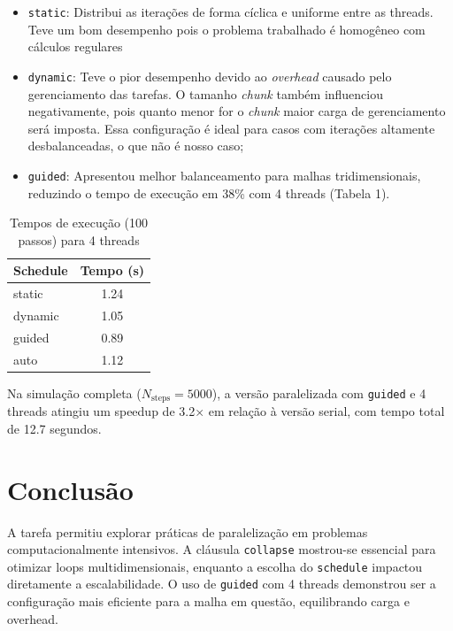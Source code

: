 \documentclass[a4paper, 12pt]{article}
\begin{document}
	
	\begin{itemize}  
		\item \texttt{static}: Distribui as iterações de forma cíclica e uniforme entre as threads. Teve um bom desempenho pois o problema trabalhado é homogêneo com cálculos regulares    
		\item \texttt{dynamic}: Teve o pior desempenho devido ao \textit{overhead} causado pelo gerenciamento das tarefas. O tamanho \textit{chunk} também influenciou negativamente, pois quanto menor for o \textit{chunk} maior carga de gerenciamento será imposta. Essa configuração é ideal para casos com iterações altamente desbalanceadas, o que não é nosso caso;  
		\item \texttt{guided}: Apresentou melhor balanceamento para malhas tridimensionais, reduzindo o tempo de execução em 38\% com 4 threads (Tabela 1).  
	\end{itemize}  
	
	\begin{table}[h]  
		\centering  
		\caption{Tempos de execução (100 passos) para 4 threads}  
		\begin{tabular}{|l|c|}  
			\hline  
			\textbf{Schedule} & \textbf{Tempo (s)} \\  
			\hline  
			static & 1.24 \\  
			dynamic & 1.05 \\  
			guided & 0.89 \\  
			auto & 1.12 \\  
			\hline  
		\end{tabular}  
	\end{table}  
	
	Na simulação completa (\( N_{\text{steps}} = 5000 \)), a versão paralelizada com \texttt{guided} e 4 threads atingiu um speedup de 3.2× em relação à versão serial, com tempo total de 12.7 segundos.  
	
	\section{Conclusão}  
	\hspace{.62cm}A tarefa permitiu explorar práticas de paralelização em problemas computacionalmente intensivos. A cláusula \texttt{collapse} mostrou-se essencial para otimizar loops multidimensionais, enquanto a escolha do \texttt{schedule} impactou diretamente a escalabilidade. O uso de \texttt{guided} com 4 threads demonstrou ser a configuração mais eficiente para a malha em questão, equilibrando carga e overhead.  
	
\end{document}
